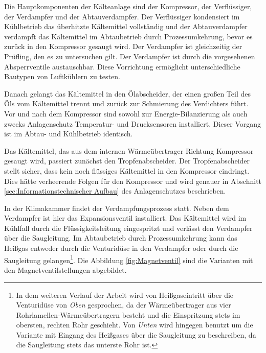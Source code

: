 Die Hauptkomponenten der Kälteanlage sind der Kompressor, der Verflüssiger, der Verdampfer und der Abtauverdampfer. Der Verflüssiger kondensiert im  Kühlbetrieb das überhitzte Kältemittel vollständig und der Abtauverdampfer verdampft das Kältemittel im Abtaubetrieb durch Prozessumkehrung, bevor es zurück in den Kompressor gesaugt wird. Der Verdampfer ist gleichzeitig der Prüfling, den es zu untersuchen gilt. Der Verdampfer ist durch die vorgesehenen Absperrventile austauschbar. Diese Vorrichtung ermöglicht unterschiedliche Bautypen von Luftkühlern zu testen. 

Danach gelangt das Kältemittel in den Ölabscheider, der einen großen Teil des Öls vom Kältemittel trennt und zurück zur Schmierung des Verdichters führt. Vor und nach dem Kompressor sind sowohl zur Energie-Bilanzierung als auch zwecks Anlagenschutz Temperatur- und Drucksensoren installiert. Dieser Vorgang ist im Abtau- und Kühlbetrieb identisch. 

Das Kältemittel, das aus dem internen Wärmeübertrager Richtung Kompressor gesaugt wird, passiert zunächst den Tropfenabscheider.  Der Tropfenabscheider stellt sicher, dass kein noch flüssiges Kältemittel in den Kompressor eindringt. Dies hätte verheerende Folgen für den Kompressor und wird genauer in Abschnitt \ref{sec:Informationstechnischer Aufbau} des Anlagenschutzes beschrieben. 

In der Klimakammer findet der Verdampfungsprozess statt. Neben dem Verdampfer ist hier das Expansionsventil installiert. Das Kältemittel wird im Kühlfall durch die Flüssigkeitsleitung eingespritzt und verlässt den Verdampfer über die Saugleitung. Im Abtaubetrieb durch Prozessumkehrung kann das Heißgas entweder durch die Venturidüse in den Verdampfer  oder durch die Saugleitung gelangen\footnote{In dem weiteren Verlauf der Arbeit wird von Heißgaseintritt über die Venturidüse von \textit{Oben} gesprochen, da der Wärmeübertrager aus vier Rohrlamellen-Wärmeübertragern besteht und die Einspritzung stets im obersten, rechten  Rohr geschieht. Von \textit{Unten} wird hingegen benutzt um die Variante mit Eingang des Heißgases über die Saugleitung zu beschreiben, da die Saugleitung stets das unterste Rohr ist.}. Die Abbildung \ref{fig:Magnetventil} sind die Varianten mit den Magnetventilstellungen abgebildet. 


